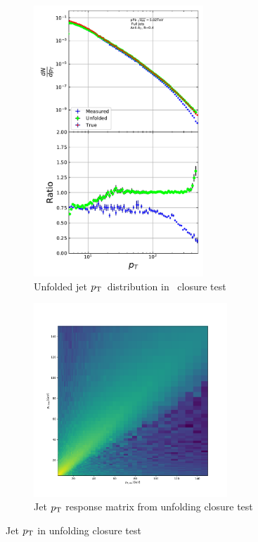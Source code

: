  \begin{figure}
\begin{subfigure}[b]{0.5\textwidth}
\includegraphics[width=0.7\textwidth]{figures/analysis/JetPtUnfolded.pdf}
\caption{Unfolded jet $p_{\rm T}$ distribution in \pythia~closure test}
\label{fig:jetptunf}
\end{subfigure}
\begin{subfigure}[b]{0.5\textwidth}
\includegraphics[width=0.8\textwidth]{figures/analysis/JetPtResponse.pdf} 
\caption{Jet $p_{\rm T}$ response matrix from unfolding closure test}
\label{fig:jetptresponse}
\end{subfigure}
\caption{Jet $p_{\rm T}$ in unfolding closure test}
\label{fig:jetptclosure}
\end{figure}
 

